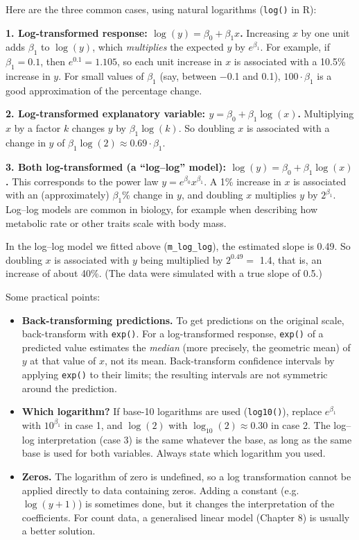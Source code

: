 \documentclass[
  letterpaper,
  8pt,
  a4paper]{book}
\providecommand{\tightlist}{%
  \setlength{\itemsep}{0pt}\setlength{\parskip}{0pt}}
\begin{document}
Here are the three common cases, using natural logarithms
(\texttt{log()} in R):

\textbf{1. Log-transformed response: \(\log(y) = \beta_0 + \beta_1 x\).}
Increasing \(x\) by one unit adds \(\beta_1\) to \(\log(y)\), which
\emph{multiplies} the expected \(y\) by \(e^{\beta_1}\). For example, if
\(\beta_1 = 0.1\), then \(e^{0.1} = 1.105\), so each unit increase in
\(x\) is associated with a 10.5\% increase in \(y\). For small values of
\(\beta_1\) (say, between −0.1 and 0.1), \(100 \cdot \beta_1\) is a good
approximation of the percentage change.

\textbf{2. Log-transformed explanatory variable:
\(y = \beta_0 + \beta_1 \log(x)\).} Multiplying \(x\) by a factor \(k\)
changes \(y\) by \(\beta_1 \log(k)\). So doubling \(x\) is associated
with a change in \(y\) of
\(\beta_1 \log(2) \approx 0.69 \cdot \beta_1\).

\textbf{3. Both log-transformed (a ``log--log'' model):
\(\log(y) = \beta_0 + \beta_1 \log(x)\).} This corresponds to the power
law \(y = e^{\beta_0} x^{\beta_1}\). A 1\% increase in \(x\) is
associated with an (approximately) \(\beta_1\)\% change in \(y\), and
doubling \(x\) multiplies \(y\) by \(2^{\beta_1}\). Log--log models are
common in biology, for example when describing how metabolic rate or
other traits scale with body mass.

In the log--log model we fitted above (\texttt{m\_log\_log}), the
estimated slope is 0.49. So doubling \(x\) is associated with \(y\)
being multiplied by \(2^{0.49} =\) 1.4, that is, an increase of about
40\%. (The data were simulated with a true slope of 0.5.)

Some practical points:

\begin{itemize}
\tightlist
\item
  \textbf{Back-transforming predictions.} To get predictions on the
  original scale, back-transform with \texttt{exp()}. For a
  log-transformed response, \texttt{exp()} of a predicted value
  estimates the \emph{median} (more precisely, the geometric mean) of
  \(y\) at that value of \(x\), not its mean. Back-transform confidence
  intervals by applying \texttt{exp()} to their limits; the resulting
  intervals are not symmetric around the prediction.
\item
  \textbf{Which logarithm?} If base-10 logarithms are used
  (\texttt{log10()}), replace \(e^{\beta_1}\) with \(10^{\beta_1}\) in
  case 1, and \(\log(2)\) with \(\log_{10}(2) \approx 0.30\) in case 2.
  The log--log interpretation (case 3) is the same whatever the base, as
  long as the same base is used for both variables. Always state which
  logarithm you used.
\item
  \textbf{Zeros.} The logarithm of zero is undefined, so a log
  transformation cannot be applied directly to data containing zeros.
  Adding a constant (e.g.~\(\log(y + 1)\)) is sometimes done, but it
  changes the interpretation of the coefficients. For count data, a
  generalised linear model (Chapter 8) is usually a better solution.
\end{itemize}
\end{document}
